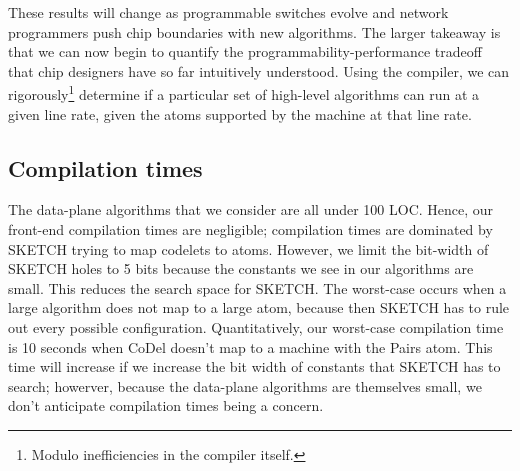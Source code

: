 These results will change as programmable switches evolve and network
programmers push chip boundaries with new algorithms.  The larger takeaway is
that we can now begin to quantify the programmability-performance tradeoff that
chip designers have so far intuitively understood. Using the \pktlanguage
compiler, we can rigorously\footnote{Modulo inefficiencies in the compiler
itself.} determine if a particular set of high-level algorithms can run at a
given line rate, given the atoms supported by the \absmachine machine at that
line rate.

\subsection{Compilation times}
The data-plane algorithms that we consider are all under 100 LOC. Hence, our
front-end compilation times are negligible; compilation times are dominated by
SKETCH trying to map codelets to atoms. However, we limit the bit-width of
SKETCH holes to 5 bits because the constants we see in our algorithms are
small.  This reduces the search space for SKETCH.  The worst-case occurs when a
large algorithm does not map to a large atom, because then SKETCH has to rule
out every possible configuration. Quantitatively, our worst-case compilation
time is 10 seconds when CoDel doesn't map to a \absmachine machine with the
Pairs atom.  This time will increase if we increase the bit width of constants
that SKETCH has to search; howerver, because the data-plane algorithms are
themselves small, we don't anticipate compilation times being a concern.
